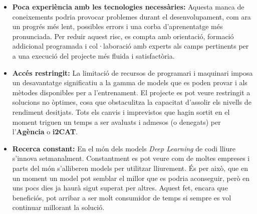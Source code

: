 \begin{itemize}
    \item \textbf{Poca experiència amb les tecnologies necessàries:} Aquesta manca de coneixements podria provocar problemes durant el desenvolupament, com ara un progrés més lent, possibles errors i una corba d'aprenentatge més pronunciada. Per reduir aquest risc, es compta amb orientació, formació addicional programada i col·laboració amb experts als camps pertinents per a una execució del projecte més fluida i satisfactòria.
    \item \textbf{Accés restringit:} La limitació de recursos de programari i maquinari imposa un desavantatge significatiu a la gamma de models que es poden provar i als mètodes disponibles per a l'entrenament. El projecte es pot veure restringit a solucions no òptimes, cosa que obstaculitza la capacitat d'assolir els nivells de rendiment desitjats. Tots els canvis i imprevistos que hagin sortit en el moment triguen un temps a ser avaluats i admesos (o denegats) per l'\textbf{Agència} o \textbf{i2CAT}.
    \item \textbf{Recerca constant:} En el món dels models \textit{Deep Learning} de codi lliure s'innova setmanalment. Constantment es pot veure com de moltes empreses i parts del món s'alliberen models per utilitzar lliurement. És per això, que en un moment un model pot semblar el millor que es podria aconseguir, però en uns pocs dies ja haurà sigut superat per altres. Aquest fet, encara que beneficiós, pot arribar a ser molt consumidor de temps si sempre es vol continuar millorant la solució.
\end{itemize}
